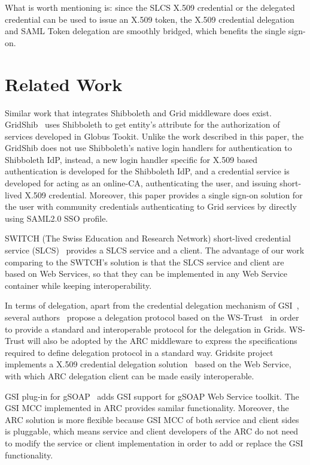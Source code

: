 \documentclass[twocolumn]{svjour3}         %
\begin{document}
What is worth mentioning is: since the SLCS X.509 credential or the delegated credential can be used to issue an X.509 token, the X.509 credential delegation and SAML Token delegation are smoothly bridged, which benefits the single sign-on.

\section{Related Work}
\label{sec:relatedwork}
Similar work that integrates Shibboleth and Grid middleware does exist. GridShib~\cite{VWelch05,TBarton06} uses Shibboleth to get entity's attribute for the authorization of services developed in Globus Tookit. Unlike the work described in this paper, the GridShib does not use Shibboleth's native login handlers for authentication to Shibboleth IdP, instead, a new login handler specific for X.509 based authentication is developed for the Shibboleth IdP, and a credential service is developed for acting as an online-CA, authenticating the user, and issuing short-lived X.509 credential. Moreover, this paper provides a single sign-on solution for the user with community credentials authenticating to Grid services by directly using SAML2.0 SSO profile.

SWITCH (The Swiss Education and Research Network) short-lived credential service (SLCS)~\cite{switchslcslink} provides a SLCS service and a client. The advantage of our work comparing to the SWTCH's solution is that the SLCS service and client are based on Web Services, so that they can be implemented in any Web Service container while keeping interoperability.

In terms of delegation, apart from the credential delegation mechanism of GSI~\cite{IFoster98,VWelch04}, several authors~\cite{MAhsant04} propose a delegation protocol based on the WS-Trust~\cite{WSTrustlink} in order to provide a standard and interoperable protocol for the delegation in Grids. WS-Trust will also be adopted by the ARC middleware to express the specifications required to define delegation protocol in a standard way. Gridsite project implements a X.509 credential delegation solution~\cite{GridSitelink} based on the Web Service, with which ARC delegation client can be made easily interoperable.

GSI plug-in for gSOAP~\cite{GAloisio05} adds GSI support for gSOAP Web Service toolkit. The GSI MCC implemented in ARC provides samilar functionality. Moreover, the ARC solution is more flexible because GSI MCC of both service and client sides is pluggable, which means service and client developers of the ARC do not need to modify the service or client implementation in order to add or replace the GSI functionality.
\end{document}
